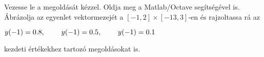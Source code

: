 Vezesse le a 
\de{} megoldását kézzel. 
Oldja meg a Matlab/Octave   segítségével is. 
Ábrázolja az egyenlet vektormezejét a $[-1,2]\times [-13,3]$-en és rajzoltassa rá 
az 
\centerline{$y(-1)=0.8, \hspace{0.8cm} y(-1)=0.5, \hspace{0.8cm} y(-1)=0.1$} 
kezdeti értékekhez tartozó megoldásokat is.


